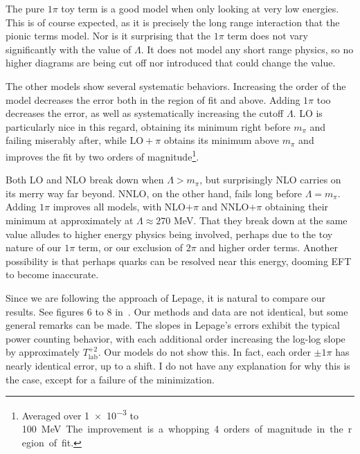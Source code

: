 The pure \(1\pi\) toy term is a good model when only looking at very low energies.
This is of course expected, as it is precisely the long range interaction that
the pionic terms model. Nor is it surprising that the \(1\pi\) term does not
vary significantly with the value of \(\Lambda\). It does not model any short
range physics, so no higher diagrams are being cut off nor introduced that could
change the value.

The other models show several systematic behaviors. Increasing the order of the
model decreases the error both in the region of fit and above. Adding \(1\pi\)
too decreases the error, as well as systematically increasing the cutoff
\(\Lambda\). LO is particularly nice in this regard, obtaining its minimum right
before \(m_{\pi}\) and failing miserably after, while \(\mathrm{LO}+\pi\) obtains its
minimum above \(m_{\pi}\) and improves the
fit by two orders of magnitude\footnote{Averaged over \num{1e-3} to \SI{100}
  MeV. The improvement is a whopping 4 orders of magnitude in the region of fit.}.

Both LO and NLO break down when
\(\Lambda > m_{\pi}\), but surprisingly NLO carries on its merry way far
beyond. NNLO, on the other hand, fails long before \(\Lambda=m_{\pi}\).  Adding \(1\pi\) improves all models, with NLO\(+\pi\) and
NNLO\(+\pi\) obtaining their minimum at approximately at
\(\Lambda\approx 270\) MeV. That they break down at the same value alludes to
higher energy
physics being involved, perhaps due to the toy nature of our \(1\pi\) term, or
our exclusion of \(2\pi\) and higher order terms. Another possibility is that
perhaps quarks can be resolved near this energy, dooming EFT to become
inaccurate.

Since we are following the approach of Lepage, it is natural to compare our results.
See figures 6 to 8 in~\cite{lepage1997renormalize}. Our methods and data are not
identical, but some general remarks can be made. The slopes in Lepage's errors exhibit the
typical power counting behavior, with each additional order
increasing the log-log slope by approximately \(T_{\mathrm{lab}}^{+2}\). Our
models do not show this. In fact, each order \(\pm 1\pi\) has nearly identical error,
up to a shift.  I do not have any explanation for why this is
the case, except for a failure of the minimization.

